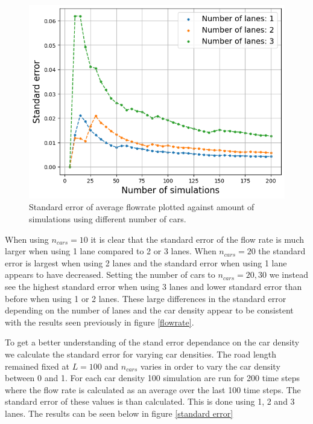 \documentclass[a4paper,12pt]{article}
\begin{document}
\begin{figure}[H]
\begin{minipage}{.5\textwidth}
    \end{minipage}
    \centering
    \begin{minipage}{.5\textwidth}
        \centering
        \includegraphics[scale=0.47]{Images/standard error 50 cars 120.png}
    \end{minipage}%
    \caption{Standard error of average flowrate plotted against amount of simulations using different number of cars.}
    \label{standard error 1}
\end{figure}

When using $n_{cars}=10$ it is clear that the standard error of the flow rate is much larger when using 1 lane compared to 2 or 3 lanes.
When $n_{cars}=20$ the standard error is largest when using 2 lanes and the standard error when using 1 lane appears to have decreased.
Setting the number of cars to $n_{cars}=20, 30$ we instead see the highest standard error when using 3 lanes and lower standard error than before 
when using 1 or 2 lanes. These large differences in the standard error depending on the number of lanes and the car density appear to 
be consistent with the results seen previously in figure \ref*{flowrate}.

To get a better understanding of the stand error dependance on the car density we calculate the standard error for varying car densities.
The road length remained fixed at $L=100$ and $n_{cars}$ varies in order to vary the car density between 0 and 1. For each car density 100 simulation are run
for 200 time steps where the flow rate is calculated as an average over the last 100 time steps. The standard error of these values is than calculated.
This is done using 1, 2 and 3 lanes. The results can be seen below in figure \ref*{standard error}
\end{document}
